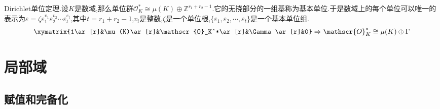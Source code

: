 Dirichlet单位定理.设$K$是数域,那么单位群$\mathscr{O}_K^*\cong\mu(K)\oplus\mathbb{Z}^{r_1+r_2-1}$.它的无挠部分的一组基称为基本单位.于是数域上的每个单位可以唯一的表示为$\varepsilon=\zeta\varepsilon_1^{v_1}\varepsilon_2^{v_2}\cdots\varepsilon_t^{e_t}$,其中$t=r_1+r_2-1$,$v_i$是整数,$\zeta$是一个单位根,$\{\varepsilon_1,\varepsilon_2,\cdots,\varepsilon_t\}$是一个基本单位组.
$$\xymatrix{1\ar[r]&\mu(K)\ar[r]&\mathscr{O}_K^*\ar[r]&\Gamma\ar[r]&0}\Rightarrow\mathscr{O}_K^*\cong\mu(K)\oplus\Gamma$$
\newpage
\section{局部域}
\subsection{赋值和完备化}

